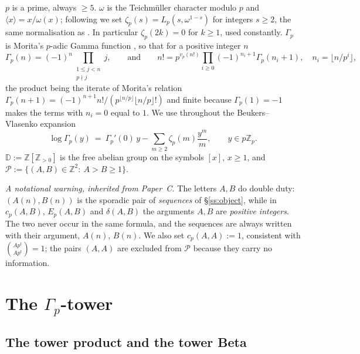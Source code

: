 \documentclass[11pt,reqno]{article}
\newcommand{\Zp}{\mathbb{Z}_p}
\newcommand{\ZZ}{\mathbb{Z}}
\newcommand{\Gp}{\Gamma_p}
\newcommand{\vp}{v_p}
\newcommand{\Pset}{\mathcal{P}}
\newcommand{\Div}{\mathbb{D}}
\newcommand{\bin}[2]{\binom{#1}{#2}}
\newcommand{\floor}[1]{\lfloor #1 \rfloor}
\theoremstyle{plain}
\theoremstyle{definition}
\theoremstyle{remark}
\numberwithin{equation}{section}
\begin{document}
$p$ is a prime, always $\ge5$.  $\omega$ is the Teichm\"uller character modulo
$p$ and $\langle x\rangle=x/\omega(x)$; following \cite[Def.~8]{LSZ2025} we set
$\zeta_p(s)=L_p(s,\omega^{1-s})$ for integers $s\ge2$, the same normalisation as
\cite{BV2025}.  In particular $\zeta_p(2k)=0$ for $k\ge1$, used constantly.
$\Gp$ is Morita's $p$-adic Gamma function \cite{Morita1975}, so that for a
positive integer $n$
\begin{equation}\label{eq:morita-int}
  \Gp(n)=(-1)^{n}\!\!\prod_{\substack{1\le j<n\\ p\nmid j}}\!\! j,
  \qquad\text{and}\qquad
  n!=p^{\vp(n!)}\prod_{i\ge0}(-1)^{n_i+1}\Gp(n_i+1),\quad n_i=\floor{n/p^i},
\end{equation}
the product being the iterate of Morita's relation
$\Gp(n+1)=(-1)^{n+1}n!/(p^{\floor{n/p}}\floor{n/p}!)$ and finite because
$\Gp(1)=-1$ makes the terms with $n_i=0$ equal to $1$.  We use throughout the
Beukers--Vlasenko expansion \cite[eq.~(2)]{BV2025}
\begin{equation}\label{eq:BV2}
  \log\Gp(y)\ =\ \Gp'(0)\,y-\sum_{m\ge2}\zeta_p(m)\frac{y^m}{m},
  \qquad y\in p\Zp .
\end{equation}
$\Div:=\ZZ[\ZZ_{>0}]$ is the free abelian group on the symbols $[x]$, $x\ge1$,
and $\Pset:=\{(A,B)\in\ZZ^2:\ A>B\ge1\}$.

\emph{A notational warning, inherited from Paper~C.}  The letters $A,B$ do
double duty: $(A(n),B(n))$ is the sporadic pair of \emph{sequences} of
\S\ref{ss:object}, while in $c_p(A,B)$, $E_p(A,B)$ and $\delta(A,B)$ the
arguments $A,B$ are \emph{positive integers}.  The two never occur in the same
formula, and the sequences are always written with their argument, $A(n)$,
$B(n)$.  We also set $c_p(A,A):=1$, consistent
with $\bin{Ap^t}{Ap^t}=1$; the pairs $(A,A)$ are excluded from $\Pset$ because
they carry no information.

\section{The $\Gp$-tower}\label{sec:tower}

\subsection{The tower product and the tower Beta}
\end{document}
